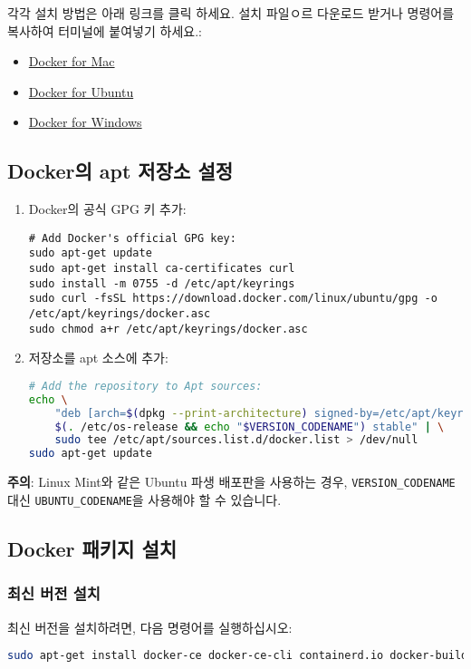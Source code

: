 각각 설치 방법은 아래 링크를 클릭 하세요. 설치 파일ㅇ르 다운로드 받거나 명령어를 복사하여 터미널에 붙여넣기 하세요.:
\begin{itemize}
    \item \href{https://docs.docker.com/docker-for-mac/}{Docker for Mac}
    \item \href{https://docs.docker.com/engine/install/ubuntu/}{Docker for Ubuntu}
    \item \href{https://docs.docker.com/desktop/install/windows-install/}{Docker for Windows}
\end{itemize}

\subsection{Docker의 apt 저장소 설정}

\begin{enumerate}
\item Docker의 공식 GPG 키 추가:
\begin{lstlisting}[language=Shell]
# Add Docker's official GPG key:
sudo apt-get update
sudo apt-get install ca-certificates curl
sudo install -m 0755 -d /etc/apt/keyrings
sudo curl -fsSL https://download.docker.com/linux/ubuntu/gpg -o /etc/apt/keyrings/docker.asc
sudo chmod a+r /etc/apt/keyrings/docker.asc
\end{lstlisting}

\item 저장소를 apt 소스에 추가:
\begin{lstlisting}[language=bash]
# Add the repository to Apt sources:
echo \
    "deb [arch=$(dpkg --print-architecture) signed-by=/etc/apt/keyrings/docker.asc] https://download.docker.com/linux/ubuntu \
    $(. /etc/os-release && echo "$VERSION_CODENAME") stable" | \
    sudo tee /etc/apt/sources.list.d/docker.list > /dev/null
sudo apt-get update
\end{lstlisting}
\end{enumerate}

\textbf{주의}: Linux Mint와 같은 Ubuntu 파생 배포판을 사용하는 경우, \texttt{VERSION\_CODENAME} 대신 \texttt{UBUNTU\_CODENAME}을 사용해야 할 수 있습니다.

\subsection{Docker 패키지 설치}

\subsubsection{최신 버전 설치}
최신 버전을 설치하려면, 다음 명령어를 실행하십시오:
\begin{lstlisting}[language=bash]
 sudo apt-get install docker-ce docker-ce-cli containerd.io docker-buildx-plugin docker-compose-plugin
\end{lstlisting}

